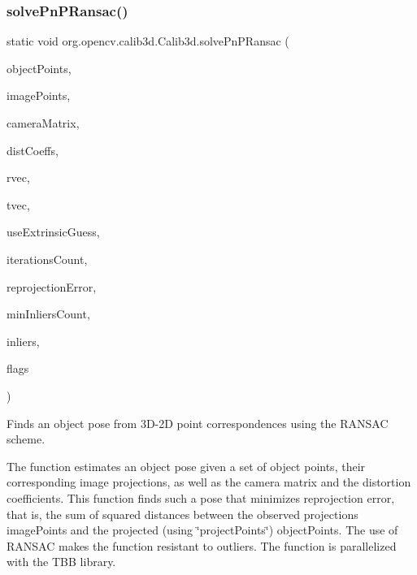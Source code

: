 \subsubsection{\texorpdfstring{solve\+Pn\+P\+Ransac()}{solvePnPRansac()}\hspace{0.1cm}{\footnotesize\ttfamily [1/2]}}
{\footnotesize\ttfamily static void org.\+opencv.\+calib3d.\+Calib3d.\+solve\+Pn\+P\+Ransac (\begin{DoxyParamCaption}\item[{\mbox{\hyperlink{classorg_1_1opencv_1_1core_1_1_mat_of_point3f}{Mat\+Of\+Point3f}}}]{object\+Points,  }\item[{\mbox{\hyperlink{classorg_1_1opencv_1_1core_1_1_mat_of_point2f}{Mat\+Of\+Point2f}}}]{image\+Points,  }\item[{\mbox{\hyperlink{classorg_1_1opencv_1_1core_1_1_mat}{Mat}}}]{camera\+Matrix,  }\item[{\mbox{\hyperlink{classorg_1_1opencv_1_1core_1_1_mat_of_double}{Mat\+Of\+Double}}}]{dist\+Coeffs,  }\item[{\mbox{\hyperlink{classorg_1_1opencv_1_1core_1_1_mat}{Mat}}}]{rvec,  }\item[{\mbox{\hyperlink{classorg_1_1opencv_1_1core_1_1_mat}{Mat}}}]{tvec,  }\item[{boolean}]{use\+Extrinsic\+Guess,  }\item[{int}]{iterations\+Count,  }\item[{float}]{reprojection\+Error,  }\item[{int}]{min\+Inliers\+Count,  }\item[{\mbox{\hyperlink{classorg_1_1opencv_1_1core_1_1_mat}{Mat}}}]{inliers,  }\item[{int}]{flags }\end{DoxyParamCaption})\hspace{0.3cm}{\ttfamily [static]}}

Finds an object pose from 3\+D-\/2D point correspondences using the R\+A\+N\+S\+AC scheme.

The function estimates an object pose given a set of object points, their corresponding image projections, as well as the camera matrix and the distortion coefficients. This function finds such a pose that minimizes reprojection error, that is, the sum of squared distances between the observed projections {\ttfamily image\+Points} and the projected (using \char`\"{}project\+Points\char`\"{}) {\ttfamily object\+Points}. The use of R\+A\+N\+S\+AC makes the function resistant to outliers. The function is parallelized with the T\+BB library.


